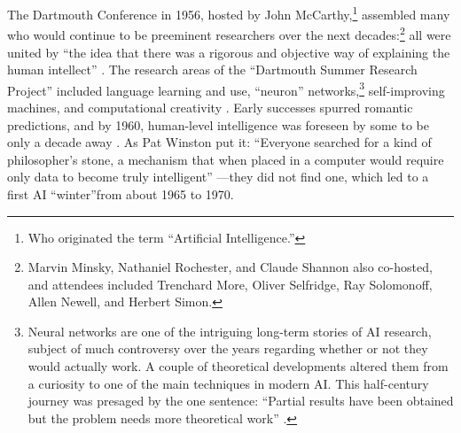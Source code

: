 

The Dartmouth
Conference in 1956, hosted by John McCarthy,\footnote{Who originated
  the term ``Artificial Intelligence.''} assembled many who would continue to
be preeminent researchers over the next decades:\footnote{Marvin Minsky, Nathaniel Rochester, and
Claude Shannon also co-hosted, and attendees included Trenchard More, Oliver Selfridge,
Ray Solomonoff, Allen Newell, and Herbert Simon.} all were united by
``the idea that there was a rigorous and objective way of explaining
the human intellect'' \cite[Ch. 5]{mccorduck}. The research areas of
the ``Dartmouth Summer Research Project'' included language learning
and use, ``neuron'' networks,\footnote{Neural networks are one of the
  intriguing long-term stories of AI research, subject of much
  controversy over the years regarding whether or not they would
  actually work. A couple of theoretical developments altered them
  from a curiosity to one of the main techniques in modern AI. This
  half-century journey was presaged by the one sentence: ``Partial
  results have been obtained but the problem needs more theoretical
  work'' \cite{dartmouthconf}.} self-improving machines, and computational 
creativity \cite{dartmouthconf}. Early successes spurred romantic
predictions, and by 1960, human-level intelligence was foreseen by
some to be only a decade away \cite[p. 3]{winston}. As Pat
Winston put it: ``Everyone searched for a kind of philosopher's stone,
a mechanism that when placed in a computer would require only data to
become truly intelligent'' \cite[p. 4]{winston}---they did not find
one, which led to a first AI ``winter''from about 1965 to 1970.




